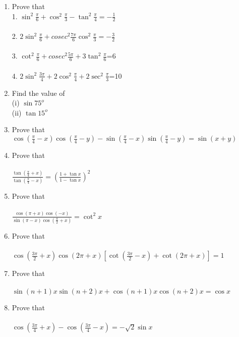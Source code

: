 \begin{enumerate}[label=\arabic*.,ref=\thesubsection.\theenumi]
\item Prove that
\\1. $\sin^{2}\frac{\pi}{6}+\cos^{2}\frac{\pi}{3}-\tan^{2}\frac{\pi}{4}=-\frac{1}{2}$\\
\\2. $2\sin^{2}\frac{\pi}{6}+cosec^{2}\frac{7\pi}{6}\cos^{2}\frac{\pi}{3}=-\frac{3}{2}$\\
\\3. $\cot^{2}\frac{\pi}{6}+cosec^{2}\frac{5\pi}{6}+3\tan^{2}\frac{\pi}{6}$=6\\
\\4. $2\sin^{2}\frac{3\pi}{4}+2\cos^{2}\frac{\pi}{4}+2\sec^{2}\frac{\pi}{3}$=10\\

\item Find the value of\\
(i) $\sin75^{o}$\\
(ii) $\tan15^{o}$\\

\item Prove that \\
 $\cos(\frac{\pi}{4}-x)\cos(\frac{\pi}{4}-y)-\sin(\frac{\pi}{4}-x)\sin(\frac{\pi}{4}-y)=\sin(x+y)$\\

\item Prove that \\
\\$\frac{\tan(\frac{\pi}{4}+x)}{\tan(\frac{\pi}{4}-x)}=(\frac{1+\tan x}{1-\tan x})^{2}$\\

\item Prove that\\
\\$\frac{\cos(\pi+x)\cos(-x)}{\sin(\pi-x)\cos(\frac{\pi}{2}+x)}=\cot^{2}x$\\

\item Prove that\\
\\$\cos(\frac{3\pi}{2}+x)\cos(2\pi+x)[\cot(\frac{3\pi}{2}-x)+\cot(2\pi +x)]=1$

\item Prove that\\
\\$\sin(n+1)x\sin(n+2)x+\cos(n+1)x\cos(n+2)x=\cos x$\\

\item Prove that\\
\\$\cos(\frac{3\pi}{4}+x)-\cos(\frac{3\pi}{4}-x)=-\sqrt 2\sin x $\\


\end{enumerate}
